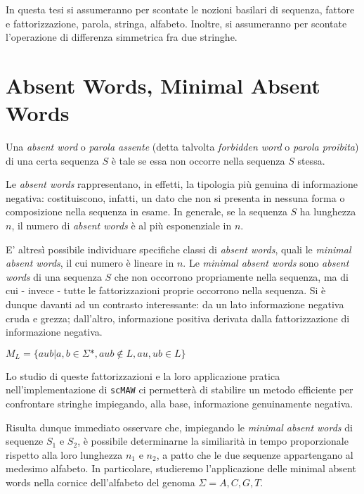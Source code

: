 In questa tesi si assumeranno per scontate le nozioni basilari di sequenza, fattore e fattorizzazione, parola, stringa, alfabeto. Inoltre, si assumeranno per scontate l'operazione di differenza simmetrica fra due stringhe.

\section{Absent Words, Minimal Absent Words}

Una \textit{absent word} o \textit{parola assente} (detta talvolta \textit{forbidden word} o \textit{parola proibita}) di una certa sequenza $S$ è tale se essa non occorre nella sequenza $S$ stessa. 

Le \textit{absent words} rappresentano, in effetti, la tipologia più genuina di informazione negativa: costituiscono, infatti, un dato che non si presenta in nessuna forma o composizione nella sequenza in esame. In generale, se la sequenza $S$ ha lunghezza $n$, il numero di \textit{absent words} è al più esponenziale in $n$. 

\vspace{3mm}

E' altresì possibile individuare specifiche classi di \textit{absent words}, quali le \textit{minimal absent words}, il cui numero è lineare in $n$. Le \textit{minimal absent words} sono \textit{absent words} di una sequenza $S$ che non occorrono propriamente nella sequenza, ma di cui - invece - tutte le fattorizzazioni proprie occorrono nella sequenza. Si è dunque davanti ad un contrasto interessante: da un lato informazione negativa cruda e grezza; dall'altro, informazione positiva derivata dalla fattorizzazione di informazione negativa. 

\(M_L = \{aub | a,b \in \Sigma*, aub\not\in L, au,ub\in L\} \)

Lo studio di queste fattorizzazioni e la loro applicazione pratica nell'implementazione di \verb|scMAW| ci permetterà di stabilire un metodo efficiente per confrontare stringhe impiegando, alla base, informazione genuinamente negativa.

\vspace{3mm}

Risulta dunque immediato osservare che, impiegando le \textit{minimal absent words} di sequenze $S_1$ e $S_2$, è possibile determinarne la similiarità in tempo proporzionale rispetto alla loro lunghezza $n_1$ e $n_2$, a patto che le due sequenze appartengano al medesimo alfabeto. In particolare, studieremo l'applicazione delle minimal absent words nella cornice dell'alfabeto del genoma $\Sigma={A, C, G, T}$.

